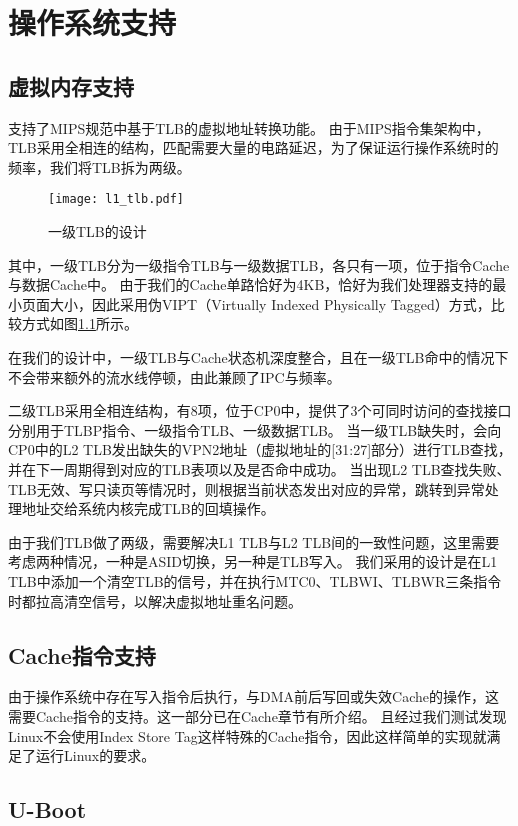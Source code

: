 \chapter{操作系统支持}

\section{虚拟内存支持}\label{section:TLB}

\cpuname 支持了MIPS规范中基于TLB的虚拟地址转换功能。
由于MIPS指令集架构中，TLB采用全相连的结构，匹配需要大量的电路延迟，为了保证运行操作系统时的频率，我们将TLB拆为两级。

\begin{figure}[h]
    \centering
    \texttt{[image: l1\_tlb.pdf]}
    \caption{一级TLB的设计}
    \label{img:l1_tlb}
\end{figure}

其中，一级TLB分为一级指令TLB与一级数据TLB，各只有一项，位于指令Cache与数据Cache中。
由于我们的Cache单路恰好为4KB，恰好为我们处理器支持的最小页面大小，因此采用伪VIPT（Virtually Indexed Physically Tagged）方式，比较方式如图\ref{img:l1_tlb}所示。

在我们的设计中，一级TLB与Cache状态机深度整合，且在一级TLB命中的情况下不会带来额外的流水线停顿，由此兼顾了IPC与频率。

二级TLB采用全相连结构，有8项，位于CP0中，提供了3个可同时访问的查找接口分别用于TLBP指令、一级指令TLB、一级数据TLB。
当一级TLB缺失时，会向CP0中的L2 TLB发出缺失的VPN2地址（虚拟地址的[31:27]部分）进行TLB查找，并在下一周期得到对应的TLB表项以及是否命中成功。
当出现L2 TLB查找失败、TLB无效、写只读页等情况时，则根据当前状态发出对应的异常，跳转到异常处理地址交给系统内核完成TLB的回填操作。

由于我们TLB做了两级，需要解决L1 TLB与L2 TLB间的一致性问题，这里需要考虑两种情况，一种是ASID切换，另一种是TLB写入。
我们采用的设计是在L1 TLB中添加一个清空TLB的信号，并在执行MTC0、TLBWI、TLBWR三条指令时都拉高清空信号，以解决虚拟地址重名问题。

\section{Cache指令支持}

由于操作系统中存在写入指令后执行，与DMA前后写回或失效Cache的操作，这需要Cache指令的支持。这一部分已在Cache章节有所介绍。
且经过我们测试发现Linux不会使用Index Store Tag这样特殊的Cache指令，因此这样简单的实现就满足了运行Linux的要求。

\section{U-Boot}

